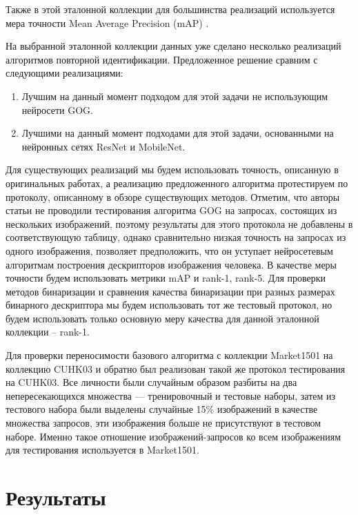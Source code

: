 \documentclass[a4paper]{article}
\begin{document}
\begin{multicols*}{2}
Также в этой эталонной коллекции для большинства реализаций используется мера точности Mean Average Precision (mAP) \cite{map}.

На выбранной эталонной коллекции данных уже сделано несколько реализаций алгоритмов повторной идентификации. Предложенное решение сравним с следующими реализациями:

\begin{enumerate}
    \item Лучшим на данный момент подходом для этой задачи не использующим нейросети GOG\cite{review1}.
    \item Лучшими на данный момент подходами для этой задачи, основанными на нейронных сетях ResNet\cite{resnet} и MobileNet\cite{dml}.
\end{enumerate}

Для существующих реализаций мы будем использовать точность, описанную в оригинальных работах, а реализацию предложенного алгоритма протестируем по протоколу, описанному в обзоре существующих методов. Отметим, что авторы статьи \cite{review1} не проводили тестирования алгоритма GOG на запросах, состоящих из нескольких изображений, поэтому результаты для этого протокола не добавлены в соответствующую таблицу, однако сравнительно низкая точность на запросах из одного изображения, позволяет предположить, что он уступает нейросетевым алгоритмам построения дескрипторов изображения человека.
В качестве меры точности будем использовать метрики mAP и rank-1, rank-5.
Для проверки методов бинаризации и сравнения качества бинаризации при разных размерах бинарного дескриптора мы будем использовать тот же тестовый протокол, но будем использовать только основную меру качества для данной эталонной коллекции -- rank-1.

Для проверки переносимости базового алгоритма с коллекции Market1501 на коллекцию CUHK03\cite{cuhk03} и обратно был реализован такой же протокол тестирования на CUHK03. Все личности были случайным образом разбиты на два непересекающихся множества — тренировочный и тестовые наборы, затем из тестового набора были выделены случайные 15\% изображений в качестве множества запросов, эти изображения больше не присутствуют в тестовом наборе. Именно такое отношение изображений-запросов ко всем изображениям для тестирования используется в Market1501.

\section{Результаты}


\end{multicols*}
\end{document}
